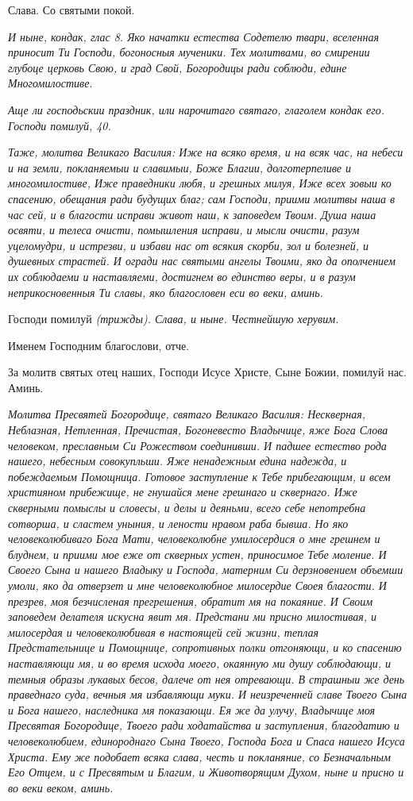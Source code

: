 Слава. Со святыми покой.


\itshape И ныне, кондак, глас 8.\normalfont{} Яко начатки естества Содетелю твари, вселенная приносит Ти Господи, богоносныя мученики. Тех молитвами, во смирении глубоце церковь Свою, и град Свой, Богородицы ради соблюди, едине Многомилостиве.


\itshape Аще ли господьскии праздник, или нарочитаго святаго, глаголем кондак его.\normalfont{} Господи помилуй, 40.


\itshape Таже, молитва Великаго Василия:\normalfont{} Иже на всяко время, и на всяк час, на небеси и на земли, покланяемыи и славимыи, Боже Благии, долготерпеливе и многомилостиве, Иже праведники любя, и грешных милуя, Иже всех зовыи ко спасению, обещания ради будущих благ; сам Господи, приими молитвы наша в час сей, и в благости исправи живот наш, к заповедем Твоим. Душа наша освяти, и телеса очисти, помышления исправи, и мысли очисти, разум уцеломудри, и истрезви, и избави нас от всякия скорби, зол и болезней, и душевных страстей. И огради нас святыми ангелы Твоими, яко да ополчением их соблюдаеми и наставляеми, достигнем во единство веры, и в разум неприкосновенныя Ти славы, яко благословен еси во веки, аминь.


Господи помилуй \itshape (трижды)\normalfont{}. Слава, и ныне. Честнейшую херувим.


Именем Господним благослови, отче.


За молитв святых отец наших, Господи Исусе Христе, Сыне Божии, помилуй нас. Аминь.


\itshape Молитва Пресвятей Богородице, святаго Великаго Василия:\normalfont{} Нескверная, Неблазная, Нетленная, Пречистая, Богоневесто Владычице, яже Бога Слова человеком, преславным Си Рожеством соединивши. И падшее естество рода нашего, небесным совокупльши. Яже ненадежным едина надежда, и побеждаемым Помощница. Готовое заступление к Тебе прибегающим, и всем християном прибежище, не гнушайся мене грешнаго и сквернаго. Иже скверными помыслы и словесы, и делы и деяньми, всего себе непотребна сотворша, и сластем уныния, и лености нравом раба бывша. Но яко человеколюбиваго Бога Мати, человеколюбне умилосердися о мне грешнем и блуднем, и приими мое еже от скверных устен, приносимое Тебе моление. И Своего Сына и нашего Владыку и Господа, матерним Си дерзновением объемши умоли, яко да отверзет и мне человеколюбное милосердие Своея благости. И презрев, моя безчисленая прегрешения, обратит мя на покаяние. И Своим заповедем делателя искусна явит мя. Предстани ми присно милостивая, и милосердая и человеколюбивая в настоящей сей жизни, теплая Предстательнице и Помощнице, сопротивных полки отгоняющи, и ко спасению наставляющи мя, и во время исхода моего, окаянную ми душу соблюдающи, и темныя образы лукавых бесов, далече от нея отревающи. В страшныи же день праведнаго суда, вечныя мя избавляющи муки. И неизреченней славе Твоего Сына и Бога нашего, наследника мя показающи. Ея же да улучу, Владычице моя Пресвятая Богородице, Твоего ради ходатайства и заступления, благодатию и человеколюбием, единороднаго Сына Твоего, Господа Бога и Спаса нашего Исуса Христа. Ему же подобает всяка слава, честь и покланяние, со Безначальным Его Отцем, и с Пресвятым и Благим, и Животворящим Духом, ныне и присно и во веки веком, аминь.


